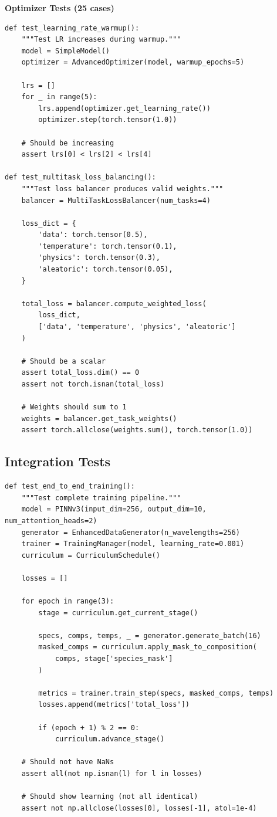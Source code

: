 \documentclass[12pt,a4paper,oneside]{report}
\begin{document}
\textbf{Optimizer Tests (25 cases)}

\begin{lstlisting}
def test_learning_rate_warmup():
    """Test LR increases during warmup."""
    model = SimpleModel()
    optimizer = AdvancedOptimizer(model, warmup_epochs=5)

    lrs = []
    for _ in range(5):
        lrs.append(optimizer.get_learning_rate())
        optimizer.step(torch.tensor(1.0))

    # Should be increasing
    assert lrs[0] < lrs[2] < lrs[4]

def test_multitask_loss_balancing():
    """Test loss balancer produces valid weights."""
    balancer = MultiTaskLossBalancer(num_tasks=4)

    loss_dict = {
        'data': torch.tensor(0.5),
        'temperature': torch.tensor(0.1),
        'physics': torch.tensor(0.3),
        'aleatoric': torch.tensor(0.05),
    }

    total_loss = balancer.compute_weighted_loss(
        loss_dict,
        ['data', 'temperature', 'physics', 'aleatoric']
    )

    # Should be a scalar
    assert total_loss.dim() == 0
    assert not torch.isnan(total_loss)

    # Weights should sum to 1
    weights = balancer.get_task_weights()
    assert torch.allclose(weights.sum(), torch.tensor(1.0))
\end{lstlisting}

\subsection{Integration Tests}

\begin{lstlisting}
def test_end_to_end_training():
    """Test complete training pipeline."""
    model = PINNv3(input_dim=256, output_dim=10, num_attention_heads=2)
    generator = EnhancedDataGenerator(n_wavelengths=256)
    trainer = TrainingManager(model, learning_rate=0.001)
    curriculum = CurriculumSchedule()

    losses = []

    for epoch in range(3):
        stage = curriculum.get_current_stage()

        specs, comps, temps, _ = generator.generate_batch(16)
        masked_comps = curriculum.apply_mask_to_composition(
            comps, stage['species_mask']
        )

        metrics = trainer.train_step(specs, masked_comps, temps)
        losses.append(metrics['total_loss'])

        if (epoch + 1) % 2 == 0:
            curriculum.advance_stage()

    # Should not have NaNs
    assert all(not np.isnan(l) for l in losses)

    # Should show learning (not all identical)
    assert not np.allclose(losses[0], losses[-1], atol=1e-4)
\end{lstlisting}
\end{document}
